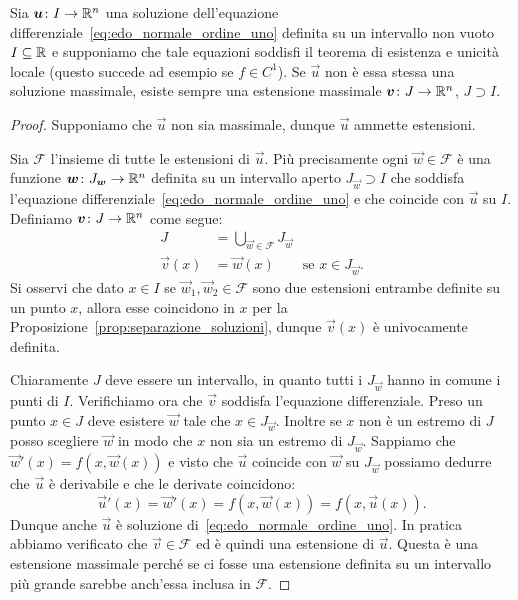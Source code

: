 \begin{theorem}
\label{th:edo_esistenza_massimali}
Sia $\boldsymbol u\colon I\to {\mathbb R}^n$ una soluzione dell'equazione differenziale~\eqref{eq:edo_normale_ordine_uno}
definita su un intervallo non vuoto $I\subseteq {\mathbb R}$
e supponiamo che tale equazioni soddisfi il teorema di esistenza e unicità locale 
(questo succede ad esempio se $f\in C^1$).
Se $\vec u$ non è essa stessa una soluzione massimale, esiste
sempre una estensione massimale $\boldsymbol v\colon J\to {\mathbb R}^n$, $J\supset I$.
\end{theorem}
%
\begin{proof}
Supponiamo che $\vec u$ non sia massimale, dunque $\vec u$ ammette estensioni. 

Sia $\mathcal F$ l'insieme di tutte le estensioni di $\vec u$.
Più precisamente ogni $\vec w\in \mathcal F$ è una funzione 
$\boldsymbol w\colon J_{\boldsymbol w}\to {\mathbb R}^n$ 
definita su un intervallo aperto $J_{\vec w}\supset I$ 
che soddisfa l'equazione differenziale~\eqref{eq:edo_normale_ordine_uno} 
e che coincide con $\vec u$ su $I$. 
Definiamo $\boldsymbol v\colon J\to{\mathbb R}^n$ come segue:
\begin{align*}
J &= \bigcup_{\vec w \in \mathcal F} J_{\vec w}\\
\vec v(x) &= \vec w(x) \qquad\text{se $x\in J_{\vec w}$}.
\end{align*}
Si osservi che dato $x\in I$ se $\vec w_1, \vec w_2\in\mathcal F$ 
sono due estensioni entrambe definite su un punto $x$, 
allora esse coincidono in $x$ per la 
Proposizione~\ref{prop:separazione_soluzioni}, 
dunque $\vec v(x)$ è univocamente definita.

Chiaramente $J$ deve essere un intervallo, 
in quanto tutti i $J_{\vec w}$ hanno in comune i punti di $I$.
Verifichiamo ora che $\vec v$ soddisfa l'equazione differenziale. 
Preso un punto $x\in J$ deve esistere $\vec w$ tale che $x\in J_{\vec w}$. 
Inoltre se $x$ non è un estremo di $J$ posso scegliere $\vec w$ in modo 
che $x$ non sia un estremo di $J_{\vec w}$.
Sappiamo che $\vec w'(x) = f(x,\vec w(x))$ e visto che $\vec u$ coincide 
con $\vec w$ su $J_{\vec w}$ possiamo dedurre che 
$\vec u$ è derivabile e che le derivate coincidono:
\[
\vec u'(x) = \vec w'(x) = f(x,\vec w(x)) = f(x,\vec u(x)).
\]
Dunque anche $\vec u$ è soluzione di~\eqref{eq:edo_normale_ordine_uno}.
In pratica abbiamo verificato che $\vec v\in \mathcal F$ ed è quindi una estensione di $\vec u$. 
Questa è una estensione massimale perché se ci fosse una estensione definita su un intervallo 
più grande 
sarebbe anch'essa inclusa in $\mathcal F$.
\end{proof}

